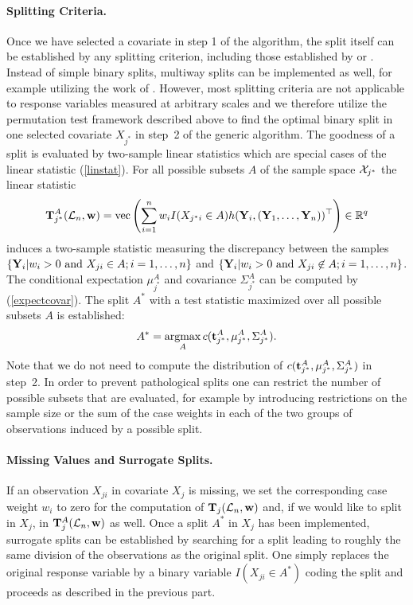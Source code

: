 \paragraph{Splitting Criteria.}
Once we have selected a covariate in step 1 of the algorithm, the split itself can be
established by any splitting criterion, including those established by
\cite{classifica:1984} or \cite{Shih1999}. Instead of simple binary splits, 
multiway splits can be implemented as well, for example utilizing
the work of \cite{OBrien2004}. However, most splitting criteria are not
applicable to response variables measured at arbitrary scales and we
therefore utilize the permutation test framework described above  
to find the optimal binary split in one selected 
covariate $X_{j^*}$ in step~2 of the generic algorithm. The goodness of a split is
evaluated by two-sample linear statistics which are special cases of the linear 
statistic (\ref{linstat}). 
For all possible subsets $A$ of the sample space $\mathcal{X}_{j^*}$ the linear
statistic
\begin{eqnarray*}
\mathbf{T}^A_{j^*}(\mathcal{L}_n, \mathbf{w}) = \text{vec} \left( \sum_{i=1}^n w_i I(X_{j^*i} \in A) 
                                  h(\mathbf{Y}_i, (\mathbf{Y}_1, \dots, \mathbf{Y}_n))^\top \right) \in \mathbb{R}^{q}
\end{eqnarray*}
induces a two-sample statistic measuring the discrepancy between the samples 
$\{ \mathbf{Y}_i | w_i > 0 \text{ and } X_{ji} \in A; i = 1, \dots, n\}$ 
and $\{ \mathbf{Y}_i | w_i > 0 \text{ and } X_{ji} \not\in A; i = 1, \dots, n\}$. 
The conditional expectation $\mu_{j^*}^A$ and covariance
$\Sigma_{j^*}^A$
can be computed by (\ref{expectcovar}).
The split $A^*$ with a test statistic maximized over all possible
subsets $A$ is established:
\begin{eqnarray} \label{split}
A^* = \operatorname{argmax}\displaylimits_A c(\mathbf{t}_{j^*}^A, \mu_{j^*}^A, \Sigma_{j^*}^A).
\end{eqnarray}
Note that we do not need to compute the distribution of 
$c(\mathbf{t}_{j^*}^A, \mu_{j^*}^A, \Sigma_{j^*}^A)$ in step~2. 
In order to prevent pathological splits one can restrict the number of
possible subsets that are evaluated, for example by introducing restrictions
on the sample size or the sum of the case weights in each of the two groups
of observations induced by a possible split. 

\paragraph{Missing Values and Surrogate Splits.}

If an observation $X_{ji}$ in covariate $X_j$ is missing, we set the
corresponding case weight $w_i$ to zero for the computation of $\mathbf{T}_j(\mathcal{L}_n, \mathbf{w})$
and, if we would like to split in $X_j$, in $\mathbf{T}_{j}^A(\mathcal{L}_n, \mathbf{w})$ as well.
Once a split $A^*$ in $X_j$ has been implemented, surrogate splits can be 
established by
searching for a split leading to roughly the same division of the
observations as the original split. One simply replaces the original
response variable by a binary variable $I(X_{ji} \in A^*)$ coding the
split and proceeds as described in the previous part. 

